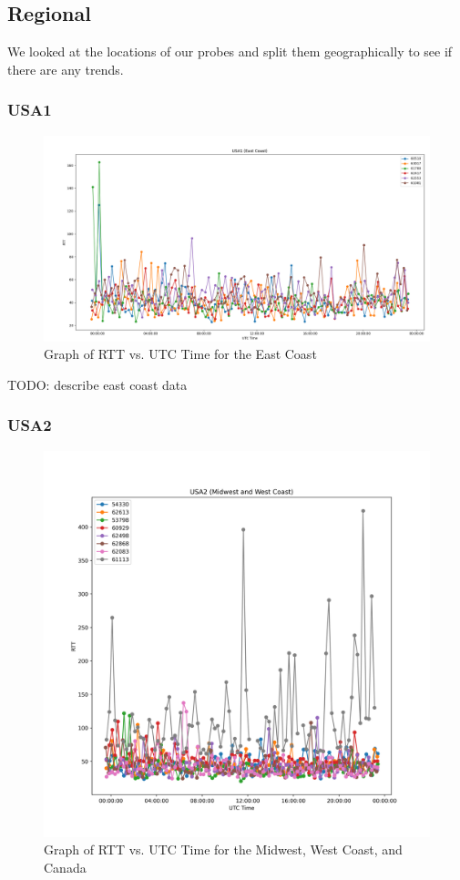 \documentclass[acmsmall]{acmart}
\begin{document}
\subsection{Regional}
We looked at the locations of our probes and split them geographically to see if there are any trends.

\subsubsection{USA1}
\begin{figure}
    \centering
    \includegraphics[scale=0.3]{graphs/usa1.png}
    \caption{Graph of RTT vs. UTC Time for the East Coast}
    \label{fig:my_label}
\end{figure}
    
TODO: describe east coast data 

\subsubsection{USA2}
\begin{figure}
    \centering
    \includegraphics[scale=0.5]{graphs/usa2.png}
    \caption{Graph of RTT vs. UTC Time for the Midwest, West Coast, and Canada }
    \label{fig:usa2}
\end{figure}
    
\end{document}
